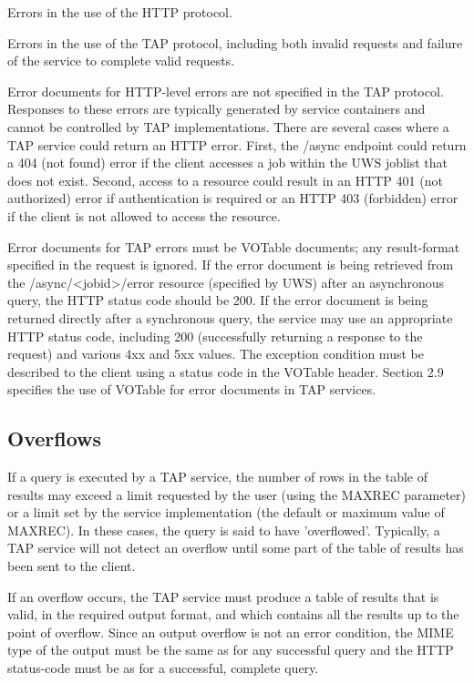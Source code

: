 \documentclass[11pt,a4paper]{ivoa}
\begin{document}
{Errors in the use of the HTTP protocol. 

Errors in the use of the TAP protocol, including both invalid requests and 
failure of the service to complete valid requests. 

Error documents for HTTP-level errors are not specified in the TAP protocol. 
Responses to these errors are typically generated by service containers and 
cannot be controlled by TAP implementations. There are several cases where a 
TAP 
service could return an HTTP error. First, the /async endpoint could return a 
404 (not found) error if the client accesses a job within the UWS joblist that 
does not exist. Second, access to a resource could result in an HTTP 401 (not 
authorized) error if authentication is required or an HTTP 403 (forbidden) 
error if the client is not allowed to access the resource.

Error documents for TAP errors must be VOTable documents;  any result-format 
specified in the request is ignored. If the error document is being retrieved 
from the /async/<jobid>/error resource (specified by UWS) after an asynchronous 
query, the HTTP status code should be 200. If the error document is being 
returned directly after a synchronous query, the service may use an appropriate 
HTTP status code, including 200 (successfully returning a response to the 
request) and various 4xx and 5xx values. The exception condition must be 
described to the client using a status code in the VOTable header.  Section   
2.9 specifies the use of VOTable for error documents in TAP services. 

\subsection{Overflows}
If a query is executed by a TAP service, the number of rows in the table of 
results may exceed a limit requested by the user (using the MAXREC parameter) 
or a limit set by the service implementation (the default or maximum value of 
MAXREC). In these cases, the query is said to have 'overflowed'. Typically, a 
TAP service will not detect an overflow until some part of the table of results 
has been sent to the client.

If an overflow occurs, the TAP service must produce a table of results that is 
valid, in the required output format, and which contains all the results up to 
the point of overflow. Since an output overflow is not an error condition, the 
MIME type of the output must be the same as for any successful query and the 
HTTP status-code must be as for a successful, complete query.

}
\end{document}
